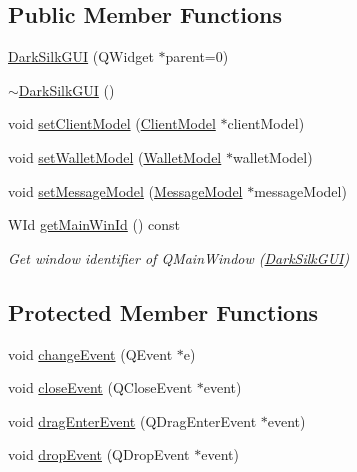 \subsection*{Public Member Functions}
\begin{DoxyCompactItemize}
\item 
\hyperlink{class_dark_silk_g_u_i_a94e64087cc435432dade5c24f3d25650}{Dark\+Silk\+G\+U\+I} (Q\+Widget $\ast$parent=0)
\item 
\hyperlink{class_dark_silk_g_u_i_a35b90333e0e26b74dc91a9e255169584}{$\sim$\+Dark\+Silk\+G\+U\+I} ()
\item 
void \hyperlink{class_dark_silk_g_u_i_a671bf7d03e729b88040ede8ae3a86ac5}{set\+Client\+Model} (\hyperlink{class_client_model}{Client\+Model} $\ast$client\+Model)
\item 
void \hyperlink{class_dark_silk_g_u_i_af1268788bf230b2d09f4213936ee8b9a}{set\+Wallet\+Model} (\hyperlink{class_wallet_model}{Wallet\+Model} $\ast$wallet\+Model)
\item 
void \hyperlink{class_dark_silk_g_u_i_a9c03f026ec3610e83fe98b3cc9f514b5}{set\+Message\+Model} (\hyperlink{class_message_model}{Message\+Model} $\ast$message\+Model)
\item 
W\+Id \hyperlink{class_dark_silk_g_u_i_a0f34c5c3f927e1e33ad124537dfdfd3b}{get\+Main\+Win\+Id} () const 
\begin{DoxyCompactList}\small\item\em Get window identifier of Q\+Main\+Window (\hyperlink{class_dark_silk_g_u_i}{Dark\+Silk\+G\+U\+I}) \end{DoxyCompactList}\end{DoxyCompactItemize}
\subsection*{Protected Member Functions}
\begin{DoxyCompactItemize}
\item 
void \hyperlink{class_dark_silk_g_u_i_a0d0d0c75b36cc12c5d3c99766eefa064}{change\+Event} (Q\+Event $\ast$e)
\item 
void \hyperlink{class_dark_silk_g_u_i_a78a6df96dd08ff62500861c2d2a5430a}{close\+Event} (Q\+Close\+Event $\ast$event)
\item 
void \hyperlink{class_dark_silk_g_u_i_a14684acdc9bf48e3bc1bf2e1f4619d38}{drag\+Enter\+Event} (Q\+Drag\+Enter\+Event $\ast$event)
\item 
void \hyperlink{class_dark_silk_g_u_i_afa1b67b5cb1a0631b7f49a9146d37a1c}{drop\+Event} (Q\+Drop\+Event $\ast$event)
\end{DoxyCompactItemize}


